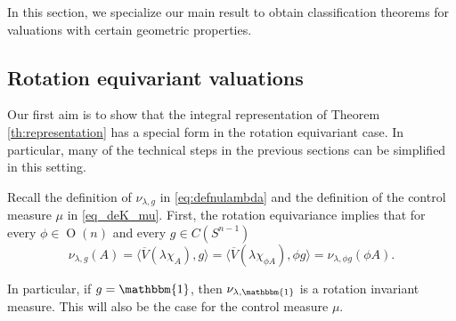 \documentclass[11pt, a4paper]{amsart}
\newcommand{\uno}{\operatorname{\mathbbm{1}}}
\newcommand{\sn}{{S^{n-1}}}
\newcommand{\on}{\operatorname{O}(n)}
\begin{document}
In this section, we specialize our main result to obtain classification theorems for valuations with certain geometric properties.

\subsection{Rotation equivariant valuations}\label{ss_rev}
Our first aim is to show that the integral representation of Theorem \ref{th:representation} has a special form in the rotation equivariant case. In particular, many of the technical steps 
in the previous sections can be simplified in this setting. 

Recall the definition of $\nu_{\lambda,g}$ in \eqref{eq:defnulambda} and the definition of the control measure $\mu$ in \eqref{eq_deK_mu}. First, the rotation equivariance implies that for every $\phi\in\on$ and every $g\in C(\sn)$
\begin{equation}\label{eq:rotation}
    \nu_{\lambda,g}(A)=\langle \overline{V}(\lambda\chi_A),g\rangle=\langle \overline{V}(\lambda\chi_{\phi A}),\phi g\rangle=\nu_{\lambda,\phi g}(\phi A).
\end{equation}
    
In particular, if $g=\uno$, then $\nu_{\lambda,\uno}$ is a rotation invariant measure. This will also be the case for the control measure $\mu$.
\end{document}
